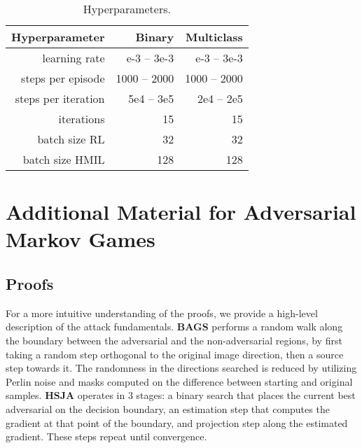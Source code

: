 \begin{table}[h!]
\centering
\renewcommand*{\arraystretch}{1.05}
\caption{Hyperparameters.}
\begin{tabular}{|r|r|r|}
\toprule
\textbf{Hyperparameter} &\bf Binary &\bf Multiclass\\
\midrule
learning rate & e-3 -- 3e-3 & e-3 -- 3e-3 \\
steps per episode & 1000 -- 2000 & 1000 -- 2000 \\
steps per iteration & 5e4 -- 3e5 & 2e4 -- 2e5\\
iterations & 15 & 15\\
batch size RL& 32 & 32\\
batch size HMIL& 128 & 128\\
\bottomrule
\end{tabular}
\label{tbl:hyper}
\end{table}

\chapter{Additional Material for Adversarial Markov Games}\label{apx:markovgames}

\section{Proofs}
\label{apx:proofs}

For a more intuitive understanding of the proofs, we provide a high-level description of the attack fundamentals.
\textbf{BAGS} \cite{brunner2019guessing} performs a random walk along the boundary between the adversarial and the non-adversarial regions, by first taking a random step orthogonal to the original image direction, then a source step towards it.
The randomness in the directions searched is reduced by utilizing Perlin noise and masks computed on the difference between starting and original samples.
\textbf{HSJA} \cite{chen2020hopskipjumpattack} operates in 3 stages: a binary search that places the current best adversarial on the decision boundary, an estimation step that computes the gradient at that point of the boundary, and projection step along the estimated gradient.
These steps repeat until convergence.
\vspace{1em}

